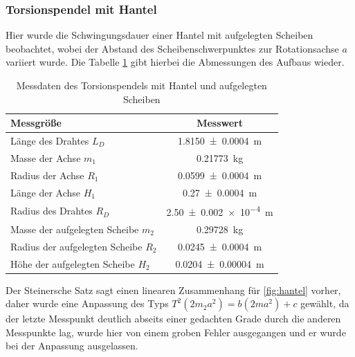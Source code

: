 










\subsubsection*{Torsionspendel mit Hantel}
Hier wurde die Schwingungsdauer einer Hantel mit aufgelegten Scheiben beobachtet, wobei der Abstand des Scheibenschwerpunktes zur Rotationsachse $a$ variiert wurde. Die Tabelle \ref{tab:dataTH} gibt hierbei die Abmessungen des Aufbaus wieder. 



\begin{table}[h]
	\centering	
	\caption{Messdaten des Torsionspendels mit Hantel und aufgelegten Scheiben  }
	\begin{tabular}{|l|c|} 
		\hline 
		Messgröße	& Messwert  \\ 
		\hline 
		Länge des Drahtes $L_D$& \SI{1.8150\pm 0.0004 } {m} \\ 
		\hline 
		Masse der Achse $m_1$& \SI{0.21773}{kg} \\ 
		\hline 
		Radius der Achse $R_1$ & \SI{0.0599 \pm 0.0004}{m}  \\ 
		\hline 
		Länge der Achse $H_1$ &	\SI{0.27\pm 0.0004}	{\metre}	\\
		\hline
		Radius des Drahtes $R_D$ & \SI{2.50+-0.002 e-4} {m} \\ 
		\hline 
		Masse der aufgelegten Scheibe $m_2$& \SI{0.29728}{kg} \\ 
		\hline 
		Radius der aufgelegten Scheibe $R_2$ & \SI{0.0245 \pm 0.0004}{m}  \\ 
		\hline 
		Höhe der aufgelegten Scheibe $H_2$ &\SI{0.0204\pm0.00004 }{\metre}			\\
		\hline
	
	\end{tabular} 
	
	\label{tab:dataTH}
\end{table} 

Der Steinersche Satz sagt einen linearen Zusammenhang für \cref{fig:hantel} vorher, daher wurde eine Anpassung des Typs $T^2(2m_2 a^2)=b (2m a^2)+c$ gewählt, da der letzte Messpunkt deutlich abseits einer gedachten Grade durch die anderen Messpunkte lag, wurde hier von einem groben Fehler ausgegangen und er wurde bei der Anpassung ausgelassen.


